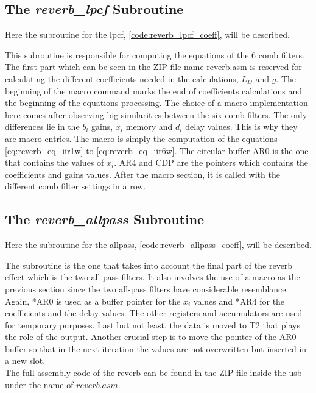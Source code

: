\subsection{The \textit{reverb_lpcf} Subroutine}
Here the subroutine for the \gls{lpcf}, \autoref{code:reverb_lpcf_coeff}, will be described.


This subroutine is responsible for computing the equations of the 6 comb filters. The first part which can be seen in the ZIP file name reverb.asm is reserved for calculating the different coefficients needed in the calculations, $L_D$ and $g$. The beginning of the macro command marks the end of coefficients calculations and the beginning of the equations processing. The choice of a macro implementation here comes after observing big similarities between the six comb filters. The only differences lie in the $b_{i}$ gains, $x_{i}$ memory and $d_{i}$ delay values. This is why they are macro entries. The macro is simply the computation of the equations \ref{eq:reverb_eq_iir1w} to \ref{eq:reverb_eq_iir6w}. The circular buffer AR0 is the one that contains the values of $x_{i}$. AR4 and CDP are the pointers which contains the coefficients and gains values.
After the macro section, it is called with the different comb filter settings in a row. 

\subsection{The \textit{reverb_allpass} Subroutine} \label{imp:reverb_allpass}
Here the subroutine for the allpass, \autoref{code:reverb_allpass_coeff}, will be described.

The subroutine is the one that takes into account the final part of the \gls{reverb} effect which is the two all-pass filters. It also involves the use of a macro as the previous section since the two all-pass filters have considerable resemblance. Again, *AR0 is used as a buffer pointer for the $x_{i}$ values and *AR4 for the coefficients and the delay values. The other registers and accumulators are used for temporary purposes.
Last but not least, the data is moved to T2 that plays the role of the output. 
Another crucial step is to move the pointer of the AR0 buffer so that in the next iteration the values are not overwritten but inserted in a new slot.\\
The full assembly code of the reverb can be found in the ZIP file inside the usb under the name of $reverb.asm$. 

